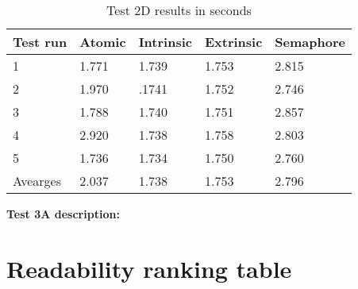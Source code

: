\documentclass[11pt]{article}
\begin{document}
\begin{table}[H]
\centering
\caption{Test 2D results in seconds}
\label{tab:my-table}
\begin{tabular}{|l|l|l|l|l|}
\hline
Test run & Atomic & Intrinsic & Extrinsic & Semaphore \\ \hline
1        & 1.771  & 1.739     & 1.753     & 2.815     \\ \hline
2        & 1.970  & .1741     & 1.752     & 2.746     \\ \hline
3        & 1.788  & 1.740     & 1.751     & 2.857     \\ \hline
4        & 2.920  & 1.738     & 1.758     & 2.803     \\ \hline
5        & 1.736  & 1.734     & 1.750     & 2.760     \\ \hline
Avearges & 2.037  & 1.738     & 1.753     & 2.796     \\ \hline
\end{tabular}
\end{table}


\textbf{Test 3A description:}
\\


\section{Readability ranking table}
\end{document}
